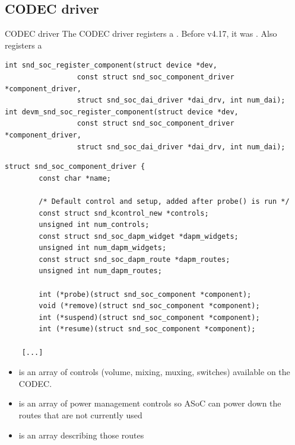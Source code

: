 
\subsection{CODEC driver}

\begin{frame}[fragile]{CODEC driver}
  The CODEC driver registers a .
  Before v4.17, it was .
  Also registers a 

  \begin{block}{}
    \fontsize{9}{9}\selectfont
    \begin{verbatim}
int snd_soc_register_component(struct device *dev,
                 const struct snd_soc_component_driver *component_driver,
                 struct snd_soc_dai_driver *dai_drv, int num_dai);
int devm_snd_soc_register_component(struct device *dev,
                 const struct snd_soc_component_driver *component_driver,
                 struct snd_soc_dai_driver *dai_drv, int num_dai);
    \end{verbatim}
  \end{block}
\end{frame}

\begin{frame}[fragile]{}
  \begin{block}{}
    \fontsize{9}{9}\selectfont
    \begin{verbatim}
struct snd_soc_component_driver {
        const char *name;

        /* Default control and setup, added after probe() is run */
        const struct snd_kcontrol_new *controls;
        unsigned int num_controls;
        const struct snd_soc_dapm_widget *dapm_widgets;
        unsigned int num_dapm_widgets;
        const struct snd_soc_dapm_route *dapm_routes;
        unsigned int num_dapm_routes;

        int (*probe)(struct snd_soc_component *component);
        void (*remove)(struct snd_soc_component *component);
        int (*suspend)(struct snd_soc_component *component);
        int (*resume)(struct snd_soc_component *component);

    [...]
    \end{verbatim}
  \end{block}
\end{frame}

\begin{frame}{}
  \begin{itemize}
  \item {} is an array of
    controls (volume, mixing, muxing, switches) available on the
    CODEC.
  \item {} is an array of
    power management controls so ASoC can power down the routes that
    are not currently used
  \item {} is an array
    describing those routes
  \end{itemize}
\end{frame}

